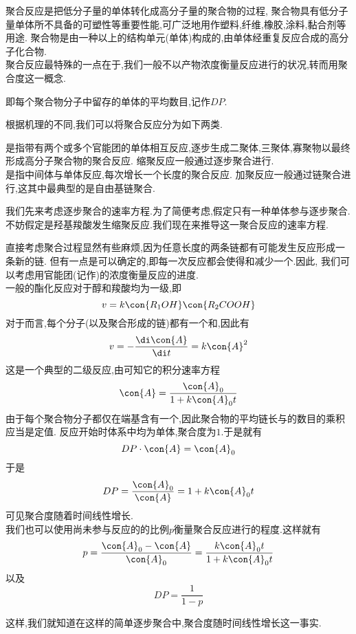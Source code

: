 \documentclass{ctexart}
\begin{document}
\pagestyle{plain}
\indent 聚合反应是把低分子量的单体转化成高分子量的聚合物的过程,%
聚合物具有低分子量单体所不具备的可塑性等重要性能,可广泛地用作塑料,纤维,橡胶,涂料,黏合剂等用途.%
聚合物是由一种以上的结构单元(单体)构成的,由单体经重复反应合成的高分子化合物.\\
\indent 聚合反应最特殊的一点在于,我们一般不以产物浓度衡量反应进行的状况,转而用聚合度这一概念.
\begin{definition}[7D.2.1 聚合度]
    即每个聚合物分子中留存的单体的平均数目,记作$DP$.
\end{definition}
根据机理的不同,我们可以将聚合反应分为如下两类.
\begin{definition}[7D.2.2 逐步聚合与链聚合]
    是指带有两个或多个官能团的单体相互反应,逐步生成二聚体,三聚体,寡聚物以最终形成高分子聚合物的聚合反应.%
    缩聚反应一般通过逐步聚合进行.\\
    是指中间体与单体反应,每次增长一个长度的聚合反应.%
    加聚反应一般通过链聚合进行,这其中最典型的是自由基链聚合.
\end{definition}
我们先来考虑逐步聚合的速率方程.为了简便考虑,假定只有一种单体参与逐步聚合.%
不妨假定是羟基羧酸发生缩聚反应.我们现在来推导这一聚合反应的速率方程.
\begin{derivation}
    直接考虑聚合过程显然有些麻烦,因为任意长度的两条链都有可能发生反应形成一条新的链.%
    但有一点是可以确定的,即每一次反应都会使得和减少一个.因此,%
    我们可以考虑用官能团(记作)的浓度衡量反应的进度.\\
    一般的酯化反应对于醇和羧酸均为一级,即
    \[v=k\con{R_1OH}\con{R_2COOH}\]
    对于而言,每个分子(以及聚合形成的链)都有一个和,因此有
    \[v=-\dfrac{\di\con{A}}{\di t}=k\con{A}^2\]
    这是一个典型的二级反应,由可知它的积分速率方程
    \[\con{A}=\dfrac{\con{A}_0}{1+k\con{A}_0t}\]
    由于每个聚合物分子都仅在端基含有一个,因此聚合物的平均链长与的数目的乘积应当是定值.%
    反应开始时体系中均为单体,聚合度为$1$.于是就有
    \[DP\cdot\con{A}=\con{A}_0\]
    于是
    \[DP=\dfrac{\con{A}_0}{\con{A}}=1+k\con{A}_0t\]
    可见聚合度随着时间线性增长.\\
    我们也可以使用尚未参与反应的的比例$p$衡量聚合反应进行的程度.这样就有
    \[p=\dfrac{\con{A}_0-\con{A}}{\con{A}_0}=\dfrac{k\con{A}_0t}{1+k\con{A}_0t}\]
    以及
    \[DP=\dfrac{1}{1-p}\]

\end{derivation}
这样,我们就知道在这样的简单逐步聚合中,聚合度随时间线性增长这一事实.%
\end{document}
